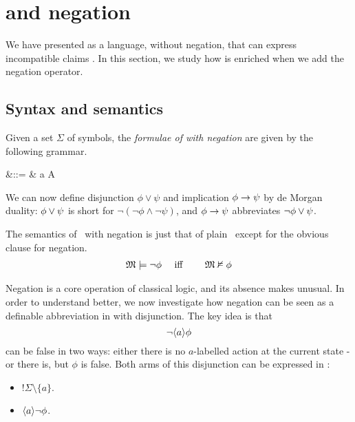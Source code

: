 \section{\Cathoristic{} and negation}\label{ELAndNegation}

\NI We have presented \cathoristic{} as a language, without negation, that can express incompatible claims .
In this section, we study how \cathoristic{}  is enriched when we add the negation operator.

\subsection{Syntax and semantics}

\begin{definition}
Given a set $\Sigma$ of symbols, the \emph{formulae of \cathoristic{}
  with negation} are given by the following grammar.
\begin{GRAMMAR}
  \phi 
     &\quad ::= \quad & 
   \top \fOr \neg \phi \fOr \phi \land \psi \fOr \langle a \rangle \phi \fOr \fBang A 
\end{GRAMMAR}

\NI We can now define disjunction $\phi \lor \psi$ and implication
$\phi \rightarrow \psi$ by de Morgan duality: $\phi \lor \psi$ is short
for $\neg (\neg \phi \land \neg \psi )$, and $\phi \rightarrow \psi$  abbreviates
$\neg\phi \lor \psi$.
\end{definition}

The semantics of \cathoristic\ with negation is just that of plain
\cathoristic\, except for the obvious clause for negation.
\begin{eqnarray*}
\frak{M} \models \neg \phi &\quad\mbox{ iff }\quad& \frak{M} \nvDash \phi  
\end{eqnarray*}

\NI Negation is a core operation of classical logic, and its absence makes
\cathoristic{} unusual. In order to understand \cathoristic{} better, we
now investigate how negation can be seen as a definable abbreviation
in \cathoristic{} with disjunction. The key idea is that 
\[
   \neg \langle a \rangle \phi
\]
can be false in two ways: either there is no $a$-labelled action at the
current state - or there is, but $\phi$ is false. Both arms of this
disjunction can be expressed in \cathoristic{}:

\begin{itemize}

\item $!\Sigma \setminus \{a\}$.

\item $\langle a \rangle \neg \phi$.

\end{itemize}

